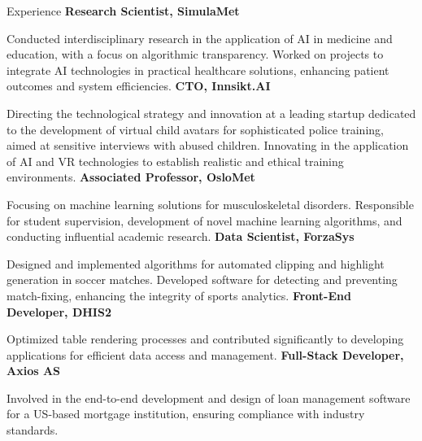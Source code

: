 \documentclass[a4paper,skipsamekey,10pt,english]{curve}
\begin{document}
\begin{rubric}{Experience}
%
\entry*[2021 -- present]%
\textbf{Research Scientist, SimulaMet} \par
Conducted interdisciplinary research in the application of AI in medicine and education, with a focus on algorithmic transparency.
Worked on projects to integrate AI technologies in practical healthcare solutions, enhancing patient outcomes and system efficiencies.
%
\entry*[2023 -- present]%
\textbf{CTO, Innsikt.AI} \par
Directing the technological strategy and innovation at a leading startup dedicated to the development of virtual child avatars for sophisticated police training, aimed at sensitive interviews with abused children.
Innovating in the application of AI and VR technologies to establish realistic and ethical training environments.
%
\entry*[2023 -- present]%
\textbf{Associated Professor, OsloMet} \par
Focusing on machine learning solutions for musculoskeletal disorders.
Responsible for student supervision, development of novel machine learning algorithms, and conducting influential academic research.
%
\entry*[2022 -- 2023]%
\textbf{Data Scientist, ForzaSys} \par
Designed and implemented algorithms for automated clipping and highlight generation in soccer matches.
Developed software for detecting and preventing match-fixing, enhancing the integrity of sports analytics.
%
\entry*[2017 -- 2018]%
\textbf{Front-End Developer, DHIS2} \par
Optimized table rendering processes and contributed significantly to developing applications for efficient data access and management.
%
\entry*[2014 -- 2016]%
\textbf{Full-Stack Developer, Axios AS} \par
Involved in the end-to-end development and design of loan management software for a US-based mortgage institution, ensuring compliance with industry standards.
%
\end{rubric}
\end{document}
